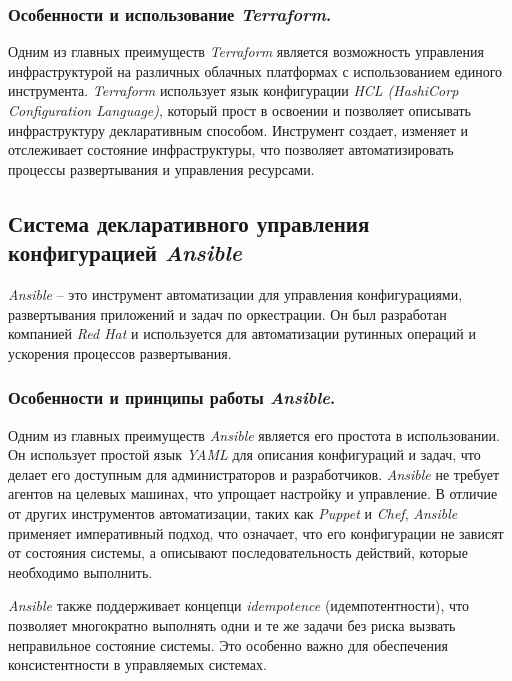 \subsubsection{Особенности и использование \textit{Terraform}.}
Одним из главных преимуществ \textit{Terraform}\cite{terraform} является возможность управления инфраструктурой на различных облачных платформах с использованием единого инструмента. \textit{Terraform} использует язык конфигурации \textit{HCL (HashiCorp Configuration Language)}, который прост в освоении и позволяет описывать инфраструктуру декларативным способом. Инструмент создает, изменяет и отслеживает состояние инфраструктуры, что позволяет автоматизировать процессы развертывания и управления ресурсами.
\subsection{Система декларативного управления конфигурацией \textit{Ansible}}
\label{sec:ansible}
\textit{Ansible} -- это инструмент автоматизации для управления конфигурациями, развертывания приложений и задач по оркестрации. Он был разработан компанией \textit{Red Hat} и используется для автоматизации рутинных операций и ускорения процессов развертывания.

\subsubsection{Особенности и принципы работы \textit{Ansible}.}
Одним из главных преимуществ \textit{Ansible} является его простота в использовании. Он использует простой язык \textit{YAML} для описания конфигураций и задач, что делает его доступным для администраторов и разработчиков. \textit{Ansible} не требует агентов на целевых машинах, что упрощает настройку и управление. В отличие от других инструментов автоматизации, таких как \textit{Puppet} и \textit{Chef}, \textit{Ansible} применяет императивный подход, что означает, что его конфигурации не зависят от состояния системы, а описывают последовательность действий, которые необходимо выполнить. 

\textit{Ansible} также поддерживает концепци \textit{idempotence} (идемпотентности), что позволяет многократно выполнять одни и те же задачи без риска вызвать неправильное состояние системы. Это особенно важно для обеспечения консистентности в управляемых системах.

